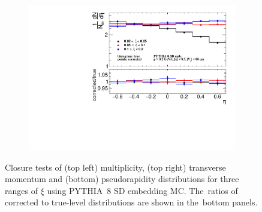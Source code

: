 \begin{figure}[b!]
\begin{subfigure}{.49\textwidth}
		\includegraphics[width=\textwidth,page=1]{chapters/chrgSTAR/img/closure/eta_test.pdf}
	\end{subfigure}
	\hfill
	\begin{minipage}{.48\textwidth}
		\caption{Closure tests of (top left) multiplicity, (top right) transverse momentum and (bottom) pseudorapidity distributions for three ranges of $\xi$ using PYTHIA~8 SD embedding MC. The~ratios of corrected to true-level distributions are shown in the~bottom panels.}
		\label{fig:closure_star}
	\end{minipage}
	
	\vspace{-1.cm}
\end{figure}


 
